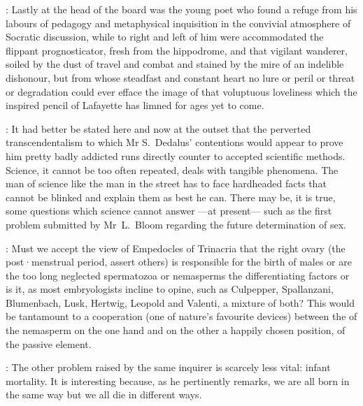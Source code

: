 :
Lastly at the head of the board was the young poet who found a
refuge from his labours of pedagogy and metaphysical inquisition in the
convivial atmosphere of Socratic discussion,
while to right and left of
him were accommodated the flippant prognosticator,
fresh from the
hippodrome,
and that vigilant wanderer,
soiled by the dust of travel and
combat and stained by the mire of an indelible dishonour,
but from whose
steadfast and constant heart no lure or peril or threat or degradation
could ever efface the image of that voluptuous loveliness which the
inspired pencil of Lafayette has limned for ages yet to come.



:
It had better be stated here and now at the outset that the perverted
transcendentalism to which Mr S.~Dedalus' contentions would
appear to prove him pretty badly addicted runs directly counter to
accepted scientific methods.
Science,
it cannot be too often repeated,
deals with tangible phenomena.
The man of science like the man in the
street has to face hardheaded facts that cannot be blinked and explain
them as best he can.
There may be,
it is true,
some questions which
science cannot answer%
---at present---%
such as the first problem submitted by
Mr~L.~Bloom
regarding the future determination of sex.

:
Must we accept the view of Empedocles of Trinacria
that the right ovary
(the post·menstrual period,
assert others)
is responsible for the birth of males or
are the too long neglected spermatozoa or nemasperms the
differentiating factors or is it,
as most embryologists incline to opine,
such as Culpepper,
Spallanzani,
Blumenbach,
Lusk,
Hertwig,
Leopold and
Valenti,
a mixture of both?
This would be tantamount to a cooperation
(one of nature's favourite devices) between
the  of the
nemasperm on the one hand and on the other a happily chosen position,
 of the passive element.

:
The other problem raised by the same inquirer is scarcely less vital:
infant mortality.
It is interesting because,
as he pertinently remarks,
we
are all born in the same way but we all die in different ways.

